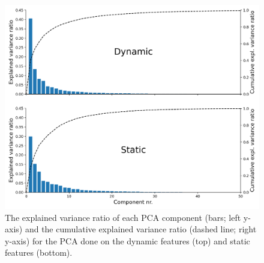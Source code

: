 \documentclass[11pt,american,a4paper,oneside,]{memoir} %
\begin{document}
\begin{figure}
\centering
\includegraphics{_bookdown_files/static-vs-dynamic-files/figures/figure_S1.pdf}
\caption{\label{fig:fig-svsd-S1}The explained variance ratio of each PCA component (bars; left y-axis) and the cumulative explained variance ratio (dashed line; right y-axis) for the PCA done on the dynamic features (top) and static features (bottom).}
\end{figure}
\end{document}
